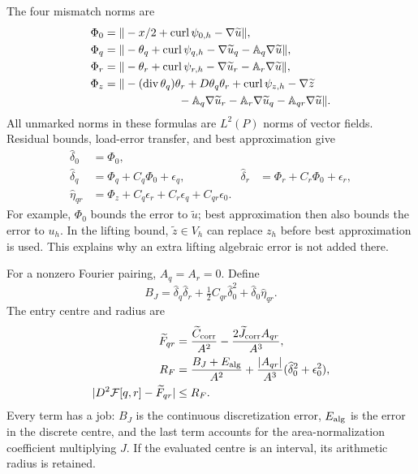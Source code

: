 The four mismatch norms are
\begin{align*}
 \Phi_0&=\|-x/2+\curl\psi_{0,h}-\nabla\widetilde u\|,\\
 \Phi_q&=\|-\theta_q+\curl\psi_{q,h}-\nabla\widetilde u_q
                                     -\mathbb A_q\nabla\widetilde u\|,\\
 \Phi_r&=\|-\theta_r+\curl\psi_{r,h}-\nabla\widetilde u_r
                                     -\mathbb A_r\nabla\widetilde u\|,\\
 \Phi_z&=\|-(\operatorname{div}\theta_q)\theta_r+D\theta_q\theta_r
                 +\curl\psi_{z,h}-\nabla\widetilde z\\
 &\hspace{23mm}-\mathbb A_q\nabla\widetilde u_r
                 -\mathbb A_r\nabla\widetilde u_q
                 -\mathbb A_{qr}\nabla\widetilde u\|.
\end{align*}
All unmarked norms in these formulas are $L^2(P)$ norms of vector fields.
Residual bounds, load-error transfer, and best approximation give
\begin{align*}
 \widehat\delta_0&=\Phi_0,\\
 \widehat\delta_q&=\Phi_q+C_q\Phi_0+\epsilon_q,
 &\widehat\delta_r&=\Phi_r+C_r\Phi_0+\epsilon_r,\\
 \widehat\eta_{qr}&=\Phi_z+C_q\epsilon_r+C_r\epsilon_q+C_{qr}\epsilon_0.
\end{align*}
For example, $\Phi_0$ bounds the error to $\widetilde u$; best
approximation then also bounds the error to $u_h$. In the lifting bound,
$\widetilde z\in V_h$ can replace $z_h$ before best approximation is used.
This explains why an extra lifting algebraic error is not added there.

For a nonzero Fourier pairing, $A_q=A_r=0$. Define
\[
 B_J=\widehat\delta_q\widehat\delta_r+\tfrac12C_{qr}\widehat\delta_0^2
                           +\widehat\delta_0\widehat\eta_{qr}.
\]
The entry centre and radius are
\begin{align}
 \widetilde F_{qr}&=\frac{\widetilde C_{\rm corr}}{A^2}
                     -\frac{2\widetilde J_{\rm corr}A_{qr}}{A^3},\notag\\
 R_F&=\frac{B_J+E_{\rm alg}}{A^2}
       +\frac{|A_{qr}|}{A^3}(\widehat\delta_0^2+\epsilon_0^2),\notag\\
 |D^2\mathcal F[q,r]-\widetilde F_{qr}|&\leq R_F.
 \label{l2:finalradius}
\end{align}
Every term has a job: $B_J$ is the continuous discretization error,
$E_{\rm alg}$ is the error in the discrete centre, and the last term
accounts for the area-normalization coefficient multiplying $J$.
If the evaluated centre is an interval, its arithmetic radius is retained.

